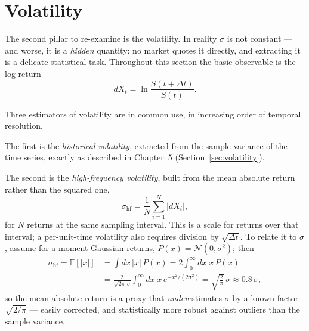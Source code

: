 \section{Volatility}\label{sec:adv-volatility}

The second pillar to re-examine is the volatility.
In reality $\sigma$ is not constant --- and worse, it is a \emph{hidden} quantity: no market quotes it directly, and extracting it is a delicate statistical task.
Throughout this section the basic observable is the log-return
\begin{equation}
dX_t = \ln\frac{S(t+\Delta t)}{S(t)}.
\end{equation}

Three estimators of volatility are in common use, in increasing order of temporal resolution.

The first is the \emph{historical volatility}, extracted from the sample variance of the time series, exactly as described in Chapter~5 (Section~\ref{sec:volatility}).

The second is the \emph{high-frequency volatility}, built from the mean absolute return rather than the squared one,
\begin{equation}
\sigma_{\text{hf}} = \frac{1}{N}\sum_{i=1}^{N}|dX_i|,
\end{equation}
for $N$ returns at the same sampling interval.
This is a scale for returns over that interval; a per-unit-time volatility also requires division by $\sqrt{\Delta t}$.
To relate it to $\sigma$, assume for a moment Gaussian returns, $P(x)=\mathcal{N}(0,\sigma^2)$; then
\begin{equation}\begin{split}
\sigma_{\text{hf}} = \mathbb{E}[|x|] &= \int dx\,|x|\,P(x) = 2\int_0^{\infty}\!dx\; x\, P(x)\\
&= \frac{2}{\sqrt{2\pi}\,\sigma}\int_0^{\infty}\!dx\; x\, e^{-x^2/(2\sigma^2)}
= \sqrt{\frac{2}{\pi}}\,\sigma \approx 0.8\,\sigma,
\end{split}\end{equation}
so the mean absolute return is a proxy that \emph{under}estimates $\sigma$ by a known factor $\sqrt{2/\pi}$ --- easily corrected, and statistically more robust against outliers than the sample variance.

